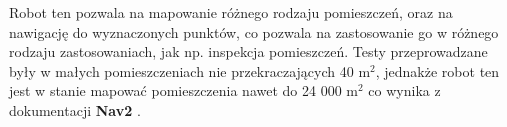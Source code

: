 \documentclass[a4paper,twoside,12pt]{book}
\begin{document}
Robot ten pozwala na mapowanie różnego rodzaju pomieszczeń, oraz na nawigację do wyznaczonych punktów, co pozwala na zastosowanie go w różnego rodzaju zastosowaniach, jak np. inspekcja pomieszczeń. Testy przeprowadzane były w małych pomieszczeniach nie przekraczających 40 m$^2$, jednakże robot ten jest w stanie mapować pomieszczenia nawet do 24 000 m$^2$ co wynika z dokumentacji \textbf{Nav2} \cite{bib:abs-2003-00368}.
%
%
%
%
%        


%
\end{document}
